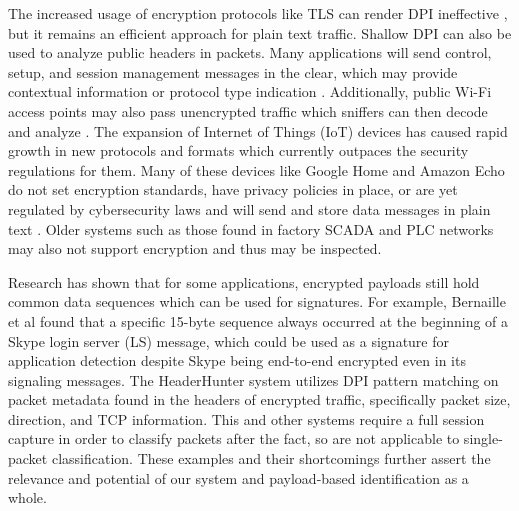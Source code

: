 The increased usage of encryption protocols like TLS can render DPI ineffective \cite{ZHAO202122}, but it remains an efficient approach for plain text traffic. Shallow DPI can also be used to analyze public headers in packets. Many applications will send control, setup, and session management messages in the clear, which may provide contextual information or protocol type indication \cite{Hasanzadeh, Ogudo, Zhang}. Additionally, public Wi-Fi access points may also pass unencrypted traffic which sniffers can then decode and analyze \cite{Maimon}. The expansion of Internet of Things (IoT) devices has caused rapid growth in new protocols and formats which currently outpaces the security regulations for them. Many of these devices like Google Home and Amazon Echo do not set encryption standards, have privacy policies in place, or are yet regulated by cybersecurity laws and will send and store data messages in plain text \cite{Wood, Capellupo, WangYong}. Older systems such as those found in factory SCADA and PLC networks may also not support encryption \cite{Malaka} and thus may be inspected.

Research has shown that for some applications, encrypted payloads still hold common data sequences which can be used for signatures. For example, Bernaille et al \cite{Bernaille} found that a specific 15-byte sequence always occurred at the beginning of a Skype login server (LS) message, which could be used as a signature for application detection despite Skype being end-to-end encrypted even in its signaling messages. The HeaderHunter system \cite{HeaderHunter} utilizes DPI pattern matching on packet metadata found in the headers of encrypted traffic, specifically packet size, direction, and TCP information. This and other systems \cite{Moore2013DiscriminatorsFU, Roughan} require a full session capture in order to classify packets after the fact, so are not applicable to single-packet classification. These examples and their shortcomings further assert the relevance and potential of our system and payload-based identification as a whole. \par

